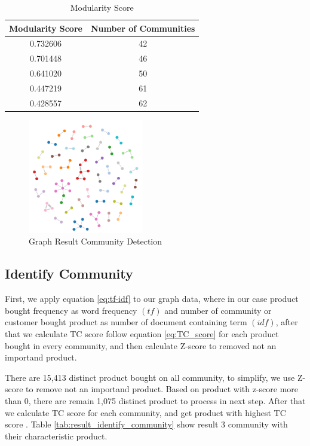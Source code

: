 \documentclass[conference]{IEEEtran}
\begin{document}
\begin{table}[h]
\renewcommand{\arraystretch}{1.3}
\caption{Modularity Score}
\label{tab:modularity_score}
\centering
\begin{tabular}{c|c}
    \hline
    Modularity Score  &  Number of Communities\\
    \hline
    0.732606 & 42\\
    \hline
    0.701448 & 46\\
    \hline
    0.641020 & 50\\
    \hline
    0.447219 & 61\\
    \hline
    0.428557 & 62\\
    \hline
\end{tabular}
\end{table}

\begin{figure}[h]
\centering
\includegraphics[width=\columnwidth, height=5cm,keepaspectratio]{figure/graph_deteksi}
\caption{Graph Result Community Detection}
\label{graph_community_detection}
\end{figure}

\subsection{Identify Community}
First, we apply equation \ref{eq:tf-idf} to our graph data, where in our case product bought frequency as word frequency \((tf)\) and number of community or customer bought product as number of document containing term \((idf)\), after that we calculate TC score follow equation \ref{eq:TC_score} for each product bought in every community, and then calculate Z-score to removed not an importand product.

There are 15,413 distinct product bought on all community, to simplify, we use Z-score to remove not an importand product. Based on product with z-score more than 0, there are remain 1,075 distinct product to process in next step. After that we calculate TC score for each community, and get product with highest TC score . Table \ref{tab:result_identify_community} show result 3 community with their characteristic product.
\end{document}
